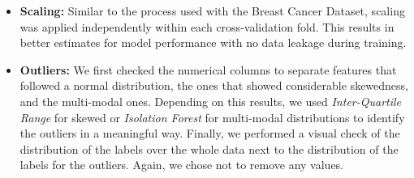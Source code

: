 \documentclass[12pt,a4paper]{article}
\begin{document}
\begin{itemize}
\item \textbf{Scaling:} Similar to the process used with the Breast Cancer Dataset, scaling was applied independently within each cross-validation fold. This results in better estimates for model performance with no data leakage during training.
\item \textbf{Outliers:} We first checked the numerical columns to separate features that followed a normal distribution, the ones that showed considerable skewedness, and the multi-modal ones. Depending on this results, we used \textit{Inter-Quartile Range} for skewed or \textit{Isolation Forest} for multi-modal distributions to identify the outliers in a meaningful way. Finally, we performed a visual check of the distribution of the labels over the whole data next to the distribution of the labels for the outliers. Again, we chose not to remove any values.
\end{itemize}

\vspace{0.5cm}
\end{document}
